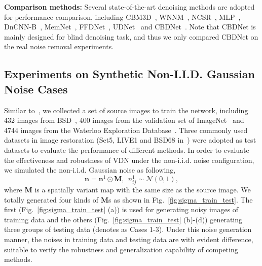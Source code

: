 \documentclass{article}
\begin{document}
\textbf{Comparison methods:} Several state-of-the-art denoising methods are adopted for performance comparison,
including CBM3D~\cite{4271520}, WNNM~\cite{gu2014weighted}, NCSR~\cite{dong2012nonlocally}, MLP~\cite{burger2012image},
DnCNN-B~\cite{zhang2017beyond}, MemNet~\cite{tai2017memnet}, FFDNet~\cite{zhang2018ffdnet}, UDNet~\cite{lefkimmiatis2018universal}
and CBDNet~\cite{guo2018toward}. Note that CBDNet is mainly designed for blind denoising task, and thus we only
compared CBDNet on the real noise removal experiments.

\vspace{-2mm}\subsection{Experiments on Synthetic Non-I.I.D. Gaussian Noise Cases}\vspace{-2mm}
Similar to~\cite{zhang2018ffdnet}, we collected a set of source images to train the network,
including 432 images from BSD~\cite{amfm_pami2011}, 400 images from the validation set of ImageNet~\cite{DengCHI14} and
4744 images from the Waterloo Exploration Database~\cite{ma2017waterloo}. Three commonly used datasets
in image restoration (Set5, LIVE1 and BSD68 in~\cite{kim2016accurate}) were adopted as test datasets to
evaluate the performance of different methods.
In order to evaluate the effectiveness and robustness of VDN under the non-i.i.d. noise configuration,
we simulated the non-i.i.d. Gaussian noise as following,
\begin{equation}
    \bm{n} = \bm{n}^1 \odot \bm{M}, ~ ~n^1_{ij} \sim \mathcal{N}(0,1),
    \label{eq:noise-generation}
\end{equation}
where $\bm{M}$ is a spatially variant map with the same size as the source image.
We totally generated four kinds of $\bm{M}$s as shown in Fig.~\ref{fig:sigma_train_test}.
The first (Fig.~\ref{fig:sigma_train_test} (a)) is used for generating noisy images of training data
and the others (Fig.~\ref{fig:sigma_train_test} (b)-(d)) generating three groups of testing data (denotes as
Cases 1-3). Under this noise generation manner, the noises in training data and testing data are
with evident difference, suitable to verify the robustness and generalization capability of competing
methods.
\end{document}
